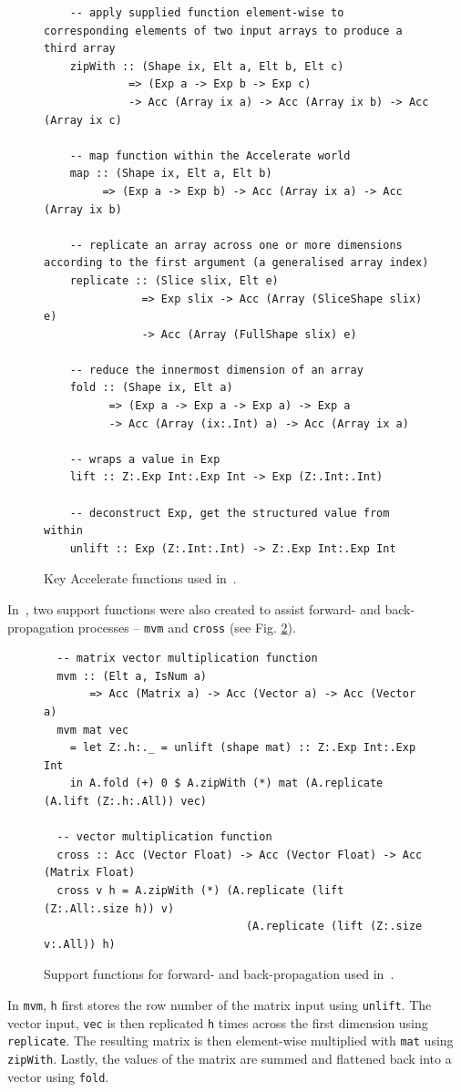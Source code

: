 \begin{figure}
  \begin{lstlisting}
    -- apply supplied function element-wise to corresponding elements of two input arrays to produce a third array 
    zipWith :: (Shape ix, Elt a, Elt b, Elt c)
             => (Exp a -> Exp b -> Exp c)
             -> Acc (Array ix a) -> Acc (Array ix b) -> Acc (Array ix c)

	-- map function within the Accelerate world
    map :: (Shape ix, Elt a, Elt b)
         => (Exp a -> Exp b) -> Acc (Array ix a) -> Acc (Array ix b)
    
    -- replicate an array across one or more dimensions according to the first argument (a generalised array index)
    replicate :: (Slice slix, Elt e)
               => Exp slix -> Acc (Array (SliceShape slix) e)
               -> Acc (Array (FullShape slix) e)
    
    -- reduce the innermost dimension of an array
    fold :: (Shape ix, Elt a)
          => (Exp a -> Exp a -> Exp a) -> Exp a
          -> Acc (Array (ix:.Int) a) -> Acc (Array ix a)
          
    -- wraps a value in Exp
    lift :: Z:.Exp Int:.Exp Int -> Exp (Z:.Int:.Int)
    
    -- deconstruct Exp, get the structured value from within
    unlift :: Exp (Z:.Int:.Int) -> Z:.Exp Int:.Exp Int
  \end{lstlisting}
  \caption{Key Accelerate functions used in~\cite{Eve16}.}
  \label{fig:acc-functions2}
\end{figure}

In~\cite{Eve16}, two support functions were also created to assist forward- and back-propagation processes -- \texttt{mvm} and \texttt{cross} (see Fig. \ref{fig:acc-functions3}).
\begin{figure}
\begin{lstlisting}
  -- matrix vector multiplication function
  mvm :: (Elt a, IsNum a)
       => Acc (Matrix a) -> Acc (Vector a) -> Acc (Vector a)
  mvm mat vec
    = let Z:.h:._ = unlift (shape mat) :: Z:.Exp Int:.Exp Int
    in A.fold (+) 0 $ A.zipWith (*) mat (A.replicate (A.lift (Z:.h:.All)) vec)
  
  -- vector multiplication function
  cross :: Acc (Vector Float) -> Acc (Vector Float) -> Acc (Matrix Float)
  cross v h = A.zipWith (*) (A.replicate (lift (Z:.All:.size h)) v)
                               (A.replicate (lift (Z:.size v:.All)) h)
\end{lstlisting}
  \caption{Support functions for forward- and back-propagation used in~\cite{Eve16}.}
  \label{fig:acc-functions3}
\end{figure}
In \texttt{mvm}, \texttt{h} first stores the row number of the matrix input using \texttt{unlift}. The vector input, \texttt{vec} is then replicated \texttt{h} times across the first dimension using \texttt{replicate}. The resulting matrix is then element-wise multiplied with \texttt{mat} using \texttt{zipWith}. Lastly, the values of the matrix are summed and flattened back into a vector using \texttt{fold}.

